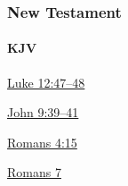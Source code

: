 		
	\subsubsection{New Testament} %
		\label{ACCOUNTABILITY-NT}
	
		\paragraph{KJV}
			\label{ACCOUNTABILITY-NT-KJV}
			
	
			
			\begin{compactdesc}
				\item[{\hyperref[LUKE-12-47]{Luke 12:47--48}}]
				\item[{\hyperref[LUKE-9-39]{John 9:39--41}}]
				\item[{\hyperref[ROMANS-4-15]{Romans 4:15}}]
				\item[{\hyperref[ROMANS-7]{Romans 7}}]
			\end{compactdesc}
			
		
			
				
